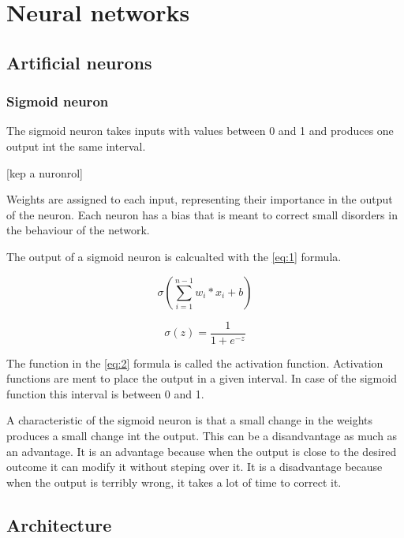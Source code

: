 \chapter{Neural networks}\label{ch:INTRO}

\section{Artificial neurons}\label{sec:INTRO:neurons}

\subsection{Sigmoid neuron}

The sigmoid neuron takes inputs with values between 0 and 1 and produces one output int the same interval.

[kep a nuronrol]

Weights are assigned to each input, representing their importance in the output of the neuron. Each neuron has a bias that is meant to correct small disorders in the behaviour of the network.

The output of a sigmoid neuron is calcualted with the \ref{eq:1} formula. 

\begin{equation} \label{eq:1}
\sigma(\sum\limits_{i=1}^{n-1} w_{i}*x_{i} + b)
\end{equation}

\begin{equation} \label{eq:2}
\sigma(z) = \frac{1}{1+e^{-z}}
\end{equation}

The function in the \ref{eq:2} formula is called the activation function. Activation functions are ment to  place the output in a given interval. In case of the sigmoid function this interval is between 0 and 1.

A characteristic of the sigmoid neuron is that a small change in the weights produces a small change int the output. This can be a disandvantage as much as an advantage. It is an advantage because when the output is close to the desired outcome it can modify it without steping over it. It is a disadvantage because when the output is terribly wrong, it takes a lot of time to correct it.


\section{Architecture}\label{sec:INTRO:architecture}

